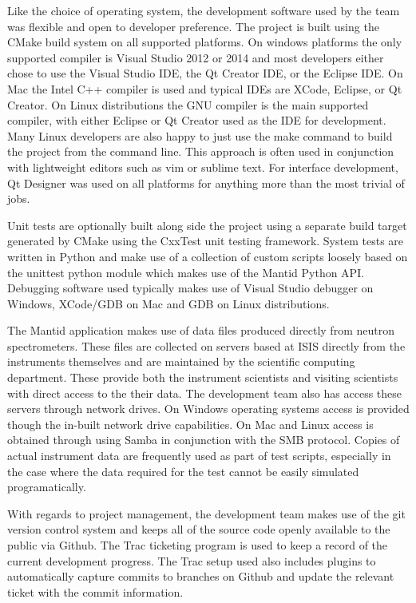 \documentclass[paper=a4, fontsize=11pt]{scrartcl}	%
\numberwithin{equation}{section}															%
\numberwithin{figure}{section}																%
\numberwithin{table}{section}
\begin{document}
Like the choice of operating system, the development software used by
the team was flexible and open to developer preference. The project is
built using the CMake build system on all supported platforms. On
windows platforms the only supported compiler is Visual Studio 2012 or
2014 and most developers either chose to use the Visual Studio IDE, the
Qt Creator IDE, or the Eclipse IDE. On Mac the Intel C++ compiler is
used and typical IDEs are XCode, Eclipse, or Qt Creator. On Linux
distributions the GNU compiler is the main supported compiler, with
either Eclipse or Qt Creator used as the IDE for development. Many Linux
developers are also happy to just use the make command to build the
project from the command line. This approach is often used in
conjunction with lightweight editors such as vim or sublime text. For
interface development, Qt Designer was used on all platforms for
anything more than the most trivial of jobs.

Unit tests are optionally built along side the project using a separate
build target generated by CMake using the CxxTest unit testing
framework. System tests are written in Python and make use of a
collection of custom scripts loosely based on the unittest python module
which makes use of the Mantid Python API. Debugging software used
typically makes use of Visual Studio debugger on Windows, XCode/GDB on
Mac and GDB on Linux distributions.

The Mantid application makes use of data files produced directly from
neutron spectrometers. These files are collected on servers based at
ISIS directly from the instruments themselves and are maintained by the
scientific computing department. These provide both the instrument
scientists and visiting scientists with direct access to the their data.
The development team also has access these servers through network
drives. On Windows operating systems access is provided though the
in-built network drive capabilities. On Mac and Linux access is obtained
through using Samba in conjunction with the SMB protocol. Copies of
actual instrument data are frequently used as part of test scripts,
especially in the case where the data required for the test cannot be
easily simulated programatically.

With regards to project management, the development team makes use of
the git version control system and keeps all of the source code openly
available to the public via Github. The Trac ticketing program is used
to keep a record of the current development progress. The Trac setup
used also includes plugins to automatically capture commits to branches
on Github and update the relevant ticket with the commit information.
\end{document}
